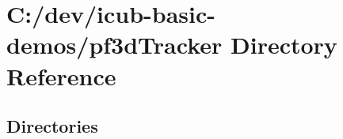 \section{C\+:/dev/icub-\/basic-\/demos/pf3d\+Tracker Directory Reference}
\label{dir_b73a721c8cbb3e92535cc94daa204a01}
\subsection*{Directories}
\begin{DoxyCompactItemize}
\end{DoxyCompactItemize}
